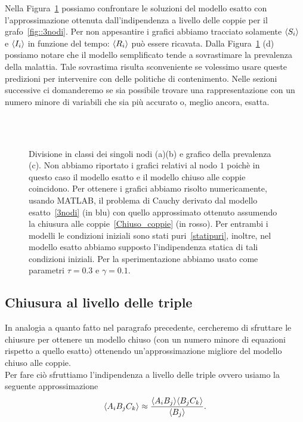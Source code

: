 Nella Figura~\ref{fig::coppie3nodi} possiamo confrontare le soluzioni del modello esatto con l'approssimazione ottenuta  dall'indipendenza a livello delle coppie per il grafo~\ref{fig::3nodi}. Per non appesantire i grafici abbiamo tracciato solamente  $\langle S_i \rangle$ e $\langle I_i \rangle$ in funzione  del tempo: $\langle  R_i \rangle$ pu\`o essere ricavata.  
Dalla Figura~\ref{fig::coppie3nodi} (d) possiamo notare che il modello semplificato tende a sovrastimare la prevalenza della malattia. Tale sovrastima risulta sconveniente se volessimo usare queste  predizioni per intervenire con delle politiche di contenimento. Nelle sezioni successive ci domanderemo se sia possibile trovare una rappresentazione con un numero minore di variabili che sia pi\`u accurato o, meglio ancora, esatta. 
\begin{figure}[!htb]
	\centering
\subfloat[][Nodo 2]
{\resizebox{0.4\textwidth}{!}{} 
 \quad 
\resizebox{0.4\textwidth}{!}{ }} \\
\subfloat[][Nodo 3]
{\resizebox{0.4\textwidth}{!}{} 
 \quad 
\resizebox{0.4\textwidth}{!}{ }}
\\
\subfloat[][Prevalenza.]
{\resizebox{0.4\textwidth}{!}{}}
\caption[Confronto tra modello esatto e chiuso alle coppie per~\ref{fig::3nodi}]{Divisione in classi dei  singoli nodi (a)(b) e grafico della prevalenza (c). Non abbiamo riportato i grafici relativi al nodo $1$ poich\`e in questo caso il modello esatto e il modello chiuso alle coppie coincidono. Per ottenere i grafici abbiamo risolto numericamente,  usando MATLAB,  il problema di Cauchy derivato dal modello esatto~\eqref{3nodi} (in blu) con quello approssimato  ottenuto   assumendo la chiusura alle coppie~\eqref{Chiuso_coppie} (in rosso).  Per entrambi i modelli le condizioni iniziali sono stati puri~\eqref{statipuri}, inoltre,  nel modello esatto abbiamo supposto l'indipendenza statica di tali condizioni iniziali. Per la sperimentazione abbiamo usato come parametri $\tau=0.3$ e $\gamma=0.1$.\\}
\label{fig::coppie3nodi}
\end{figure}

\subsection{Chiusura al livello delle triple}
In analogia a quanto fatto nel paragrafo precedente, cercheremo di sfruttare le chiusure per ottenere un modello chiuso (con un numero minore di equazioni rispetto a quello esatto) ottenendo un'approssimazione migliore del modello chiuso alle coppie.\\
Per fare ci\`o sfruttiamo l'indipendenza a livello delle triple ovvero usiamo la seguente approssimazione 
$$ \langle  A_i B_j C_k  \rangle\approx \frac{\langle A_iB_j \rangle\langle B_jC_k \rangle}{\langle B_j \rangle}.$$  \\


